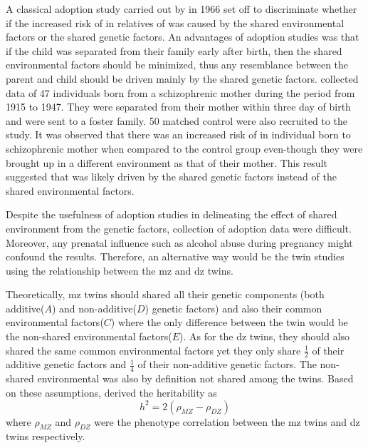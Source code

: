 \documentclass[12pt]{book}
\newcommand*{\glng}{\glsentrylong}
\begin{document}
	A classical adoption study carried out by \citet{HESTON1966} in 1966 set off to discriminate whether if the increased risk of \glng{scz} in relatives of \glng{scz} was caused by the shared environmental factors or the shared genetic factors. 
	An advantages of adoption studies was that if the child was separated from their family early after birth, then the shared environmental factors should be minimized, thus any resemblance between the parent and child should be driven mainly by the shared genetic factors.
	\citet{HESTON1966} collected data of 47 individuals born from a schizophrenic mother during the period from 1915 to 1947. 
	They were separated from their mother within three day of birth and were sent to a foster family. 
	50 matched control were also recruited to the study.
	It was observed that there was an increased risk of \glng{scz} in individual born to schizophrenic mother when compared to the control group even-though they were brought up in a different environment as that of their mother.
	This result suggested that \glng{scz} was likely driven by the shared genetic factors instead of the shared environmental factors.
	
	Despite the usefulness of adoption studies in delineating the effect of shared environment from the genetic factors, collection of adoption data were difficult. 
	Moreover, any prenatal influence such as alcohol abuse during pregnancy might confound the results.
	Therefore, an alternative way would be the twin studies using the relationship between the \gls{mz} and \gls{dz} twins.
	
	Theoretically, \gls{mz} twins should shared all their genetic components (both additive($A$) and non-additive($D$) genetic factors) and also their common environmental factors($C$) where the only difference between the twin would be the non-shared environmental factors($E$). 
	As for the \gls{dz} twins, they should also shared the same common environmental factors yet they only share $\frac{1}{2}$ of their additive genetic factors and $\frac{1}{4}$ of their non-additive genetic factors. 
	The non-shared environmental was also by definition not shared among the twins\citep{Rijsdijk2002}.
	Based on these assumptions, \cite{Falconer1996} derived the heritability as
	\begin{equation}
	h^2 = 2(\rho_{MZ}-\rho_{DZ})
	\end{equation}
	where $\rho_{MZ}$ and $\rho_{DZ}$ were the phenotype correlation between the \gls{mz} twins and \gls{dz} twins respectively.
	
\end{document}
